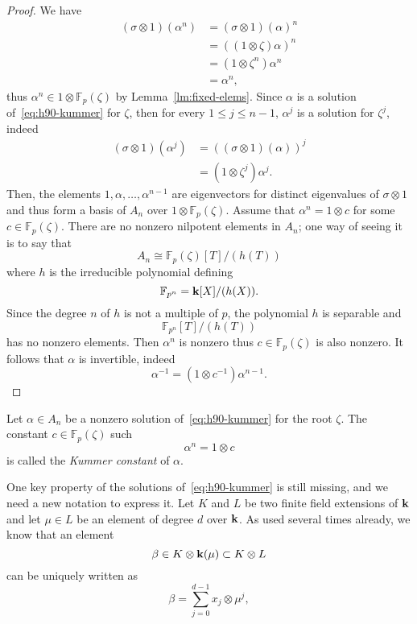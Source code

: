 \begin{proof}
  We have
  \begin{align*}
    (\sigma\otimes1)(\alpha^n) &= (\sigma\otimes1)(\alpha)^n\\
    &= ((1\otimes\zeta)\alpha)^n\\
    &= (1\otimes\zeta^n)\alpha^n\\
    &= \alpha^n,
  \end{align*}
  thus $\alpha^n\in1\otimes\mathbb{F}_p(\zeta)$ by Lemma~\ref{lm:fixed-elems}.
  Since $\alpha$ is a solution of~\eqref{eq:h90-kummer} for $\zeta$, then
  for every $1\leq j\leq n-1$, $\alpha^j$ is a solution for $\zeta^j$, indeed
  \begin{align*}
    (\sigma\otimes 1)(\alpha^j) &= ( (\sigma\otimes1)(\alpha))^j\\
    &= (1\otimes\zeta^j)\alpha^j.
  \end{align*}
  Then, the elements $1, \alpha, \dots, \alpha^{n-1}$ are eigenvectors for
  distinct eigenvalues of $\sigma\otimes1$ and thus form a basis of $A_n$ over
  $1\otimes \mathbb{F}_{p}(\zeta)$. Assume that $\alpha^n=1\otimes c$ for some
  $c\in\mathbb{F}_{p}(\zeta)$. There are no nonzero nilpotent elements in $A_n$;
  one way of seeing it is to say that
  \[
    A_n \cong \mathbb{F}_{p}(\zeta)[T]/(h(T))
  \]
  where $h$ is the irreducible polynomial defining
  \[
    \mathbb{F}_{p^n} = \mathbf{k}[X]/(h(X)).
  \]
  Since the degree $n$ of
  $h$ is not a multiple of $p$, the polynomial $h$ is separable and 
  \[
    \mathbb{F}_{p^n}[T]/(h(T))
  \]
  has no nonzero elements. Then $\alpha^n$ is nonzero thus
  $c\in\mathbb{F}_p(\zeta)$ is also nonzero. It follows that $\alpha$ is
  invertible, indeed
  \[
    \alpha^{-1} = (1\otimes c^{-1})\alpha^{n-1}.
  \]
 \end{proof}
 \begin{defi}
   Let $\alpha\in A_n$ be a nonzero solution of~\eqref{eq:h90-kummer} for the
   root $\zeta$. The constant $c\in\mathbb{F}_p(\zeta)$ such
   \[
     \alpha^n = 1\otimes c
   \]
   is called the \emph{Kummer constant} of $\alpha$.
 \end{defi}
 One key property of the solutions of~\eqref{eq:h90-kummer} is still missing,
 and we need a new notation to express it. Let $K$ and $L$ be two finite field
 extensions of $\mathbf{k}$ and let $\mu\in L$ be an element of degree $d$ over $\mathbf{k}$. As
 used several times already, we know that an element 
 \[
   \beta\in K\otimes \mathbf{k}(\mu)\subset K\otimes L 
 \]
   can be uniquely written as
 \[
   \beta=\sum_{j=0}^{d-1}x_j\otimes\mu^j,
 \]
